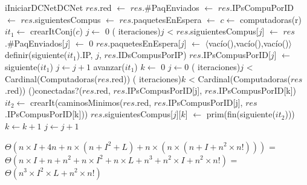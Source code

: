 \begin{Algoritmos}


  \begin{algoritmo}{iIniciarDCNet}{}{DCNet}
    $res$.red $\gets$    
    $res$.\#PaqEnviados $\gets$     
    $res$.IPsCompuPorID $\gets$     
    $res$.siguientesCompus $\gets$     
    $res$.paquetesEnEspera $\gets$     
     $c \gets$ computadoras(r)   
     $it_{1} \gets$ crearItConj($c$)    
     $j \gets$ 0   
    \While( iteraciones){$j$ < }{
      $res$.siguientesCompus[$j$] $\gets$     
      $res$.\#PaqEnviados[$j$] $\gets$ 0   
      $res$.paquetesEnEspera[$j$] $\gets$ $\langle$vac\'{i}o(),vac\'{i}o(),vac\'{i}o()$\rangle$   
      definir(siguiente($it_{1}$).IP, $j$, $res$.IDsCompusPorIP)   
      $res$.IPsCompusPorID[$j$] $\gets$ siguiente($it_{1}$)    
      $j \gets j + 1$   
      avanzar($it_{1}$)   
    }
     $k \gets$ 0   
    $j \gets 0$   
    \While( iteraciones){$j$ < Cardinal(Computadoras($res$.red))}{
      \While( iteraciones){$k$ < Cardinal(Computadoras($res$.red))}{
        \If(){conectadas?($res$.red, $res$.IPsCompusPorID[j], $res$.IPsCompusPorID[k])}{
           $it_{2} \gets$ crearIt(caminosMinimos($res$.red, $res$.IPsCompusPorID[j], $res$.IPsCompusPorID[k]))\;
          $res$.siguientesCompus[$j$][$k$] $\gets$ prim(fin(siguiente($it_{2}$)))   
        }
        $k \gets k + 1$  
      }
      $j \gets j + 1$  
    }
  \end{algoritmo}
 \datosAlgoritmo{} %
  {} %
  {} %
  {$\Theta(n \times I + 4 n + n \times (n + I^2 + L) + n \times (n \times (n + I + n^2 \times n!)))$ = $\Theta(n \times I + n + n^2+ n \times I^2 + n \times L + n^3 + n^2 \times I + n^2 \times n!)$ = $\Theta(n^3 \times I^2 \times L + n^2 \times n!)$} %
  {} %


\end{Algoritmos}

